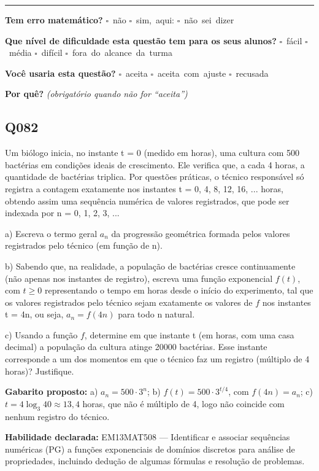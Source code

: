 \documentclass[11pt,a4paper]{article}
\begin{document}
\noindent\rule{\linewidth}{0.4pt}
\textbf{Tem erro matemático?}\quad
\mbox{$\square$~não} \quad \mbox{$\square$~sim, aqui:} \underline{\hspace{5cm}}
\quad \mbox{$\square$~não sei dizer}

\textbf{Que nível de dificuldade esta questão tem para os seus alunos?}\quad
\mbox{$\square$~fácil} \quad \mbox{$\square$~média} \quad
\mbox{$\square$~difícil} \quad \mbox{$\square$~fora do alcance da turma}

\textbf{Você usaria esta questão?}\quad
\mbox{$\square$~aceita} \quad \mbox{$\square$~aceita com ajuste} \quad
\mbox{$\square$~recusada}

\textbf{Por quê?} \emph{(obrigatório quando não for ``aceita'')}

\underline{\hspace{\linewidth}}

\underline{\hspace{\linewidth}}
\vspace{0.6em}

\begin{samepage}
\subsection*{Q082}
Um biólogo inicia, no instante t = 0 (medido em horas), uma cultura com 500 bactérias em condições ideais de crescimento. Ele verifica que, a cada 4 horas, a quantidade de bactérias triplica. Por questões práticas, o técnico responsável só registra a contagem exatamente nos instantes t = 0, 4, 8, 12, 16, ... horas, obtendo assim uma sequência numérica de valores registrados, que pode ser indexada por n = 0, 1, 2, 3, ...

a) Escreva o termo geral $a_n$ da progressão geométrica formada pelos valores registrados pelo técnico (em função de n).

b) Sabendo que, na realidade, a população de bactérias cresce continuamente (não apenas nos instantes de registro), escreva uma função exponencial $f(t)$, com $t \geq 0$ representando o tempo em horas desde o início do experimento, tal que os valores registrados pelo técnico sejam exatamente os valores de $f$ nos instantes t = 4n, ou seja, $a_n = f(4n)$ para todo n natural.

c) Usando a função $f$, determine em que instante t (em horas, com uma casa decimal) a população da cultura atinge 20000 bactérias. Esse instante corresponde a um dos momentos em que o técnico faz um registro (múltiplo de 4 horas)? Justifique.

\textbf{Gabarito proposto:} a) $a_n = 500\cdot 3^n$; b) $f(t) = 500\cdot 3^{t/4}$, com $f(4n)=a_n$; c) $t = 4\log_3 40 \approx 13{,}4$ horas, que não é múltiplo de 4, logo não coincide com nenhum registro do técnico.

\textbf{Habilidade declarada:} EM13MAT508 --- Identificar e associar sequências numéricas (PG) a funções exponenciais de domínios discretos para análise de propriedades, incluindo dedução de algumas fórmulas e resolução de problemas.
\end{samepage}
\end{document}
